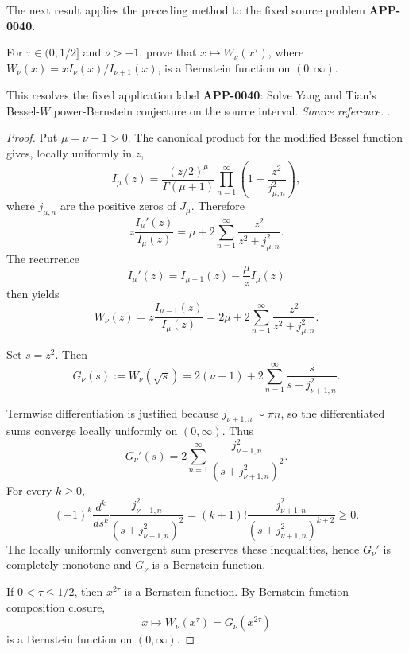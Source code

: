 The next result applies the preceding method to the fixed source problem \textbf{APP-0040}.
\begin{corollary}
\label{res:yt-bessel-w-power-bernstein-conjecture}
For \(\tau\in(0,1/2]\) and \(\nu>-1\), prove that \(x\mapsto W_\nu(x^\tau)\), where \(W_\nu(x)=xI_\nu(x)/I_{\nu+1}(x)\), is a Bernstein function on \((0,\infty)\).

This resolves the fixed application label \textbf{APP-0040}: Solve Yang and Tian's Bessel-\(W\) power-Bernstein conjecture on the source interval.
\emph{Source reference.} \cite{app-app-0040-source}.
\end{corollary}
\begin{proof}
Put \(\mu=\nu+1>0\). The canonical product for the modified Bessel function gives, locally uniformly in \(z\),
\[
I_\mu(z)=\frac{(z/2)^\mu}{\Gamma(\mu+1)}
\prod_{n=1}^{\infty}\left(1+\frac{z^2}{j_{\mu,n}^2}\right),
\]
where \(j_{\mu,n}\) are the positive zeros of \(J_\mu\). Therefore
\[
z\frac{I_\mu'(z)}{I_\mu(z)}
=\mu+2\sum_{n=1}^{\infty}\frac{z^2}{z^2+j_{\mu,n}^2}.
\]
The recurrence
\[
I_\mu'(z)=I_{\mu-1}(z)-\frac{\mu}{z}I_\mu(z)
\]
then yields
\[
W_\nu(z)
=z\frac{I_{\mu-1}(z)}{I_\mu(z)}
=2\mu+2\sum_{n=1}^{\infty}\frac{z^2}{z^2+j_{\mu,n}^2}.
\]

Set \(s=z^2\). Then
\[
G_\nu(s):=W_\nu(\sqrt s)
=2(\nu+1)+2\sum_{n=1}^{\infty}\frac{s}{s+j_{\nu+1,n}^2}.
\]

Termwise differentiation is justified because \(j_{\nu+1,n}\sim \pi n\), so the differentiated sums converge locally uniformly on \((0,\infty)\). Thus
\[
G_\nu'(s)
=2\sum_{n=1}^{\infty}
\frac{j_{\nu+1,n}^2}{(s+j_{\nu+1,n}^2)^2}.
\]
For every \(k\ge0\),
\[
(-1)^k\frac{d^k}{ds^k}
\frac{j_{\nu+1,n}^2}{(s+j_{\nu+1,n}^2)^2}
=
(k+1)!\frac{j_{\nu+1,n}^2}{(s+j_{\nu+1,n}^2)^{k+2}}
\ge0.
\]
The locally uniformly convergent sum preserves these inequalities, hence \(G_\nu'\) is completely monotone and \(G_\nu\) is a Bernstein function.

If \(0<\tau\le1/2\), then \(x^{2\tau}\) is a Bernstein function. By Bernstein-function composition closure,
\[
x\mapsto W_\nu(x^\tau)=G_\nu(x^{2\tau})
\]
is a Bernstein function on \((0,\infty)\).
\end{proof}

